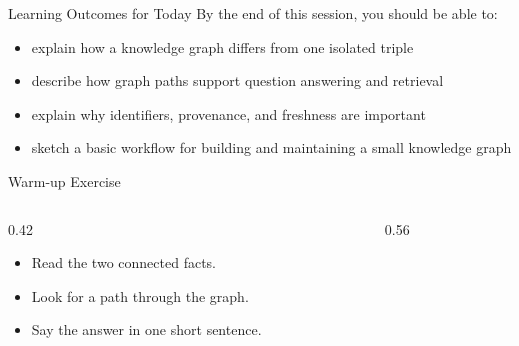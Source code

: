 \documentclass[aspectratio=169]{beamer}
\begin{document}
\begin{frame}{Learning Outcomes for Today}
By the end of this session, you should be able to:
\begin{itemize}
  \item explain how a knowledge graph differs from one isolated triple
  \item describe how graph paths support question answering and retrieval
  \item explain why identifiers, provenance, and freshness are important
  \item sketch a basic workflow for building and maintaining a small knowledge graph
\end{itemize}
\end{frame}

\begin{frame}{Warm-up Exercise}
\begin{columns}[T,onlytextwidth]
  \begin{column}{0.42\textwidth}
    \begin{itemize}
      \item Read the two connected facts.
      \item Look for a path through the graph.
      \item Say the answer in one short sentence.
    \end{itemize}
  \end{column}
  \begin{column}{0.56\textwidth}
    \begin{center}
    \end{center}
  \end{column}
\end{columns}
\end{frame}
\end{document}
